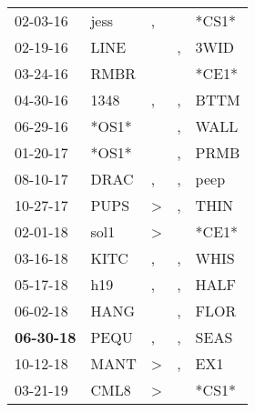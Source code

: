 \begin{supertabular}{p{0.07\textwidth}p{0.06\textwidth}p{0.02\textwidth}p{0.02\textwidth}p{0.06\textwidth}}
          02-03-16\textsuperscript{} &           jess\textsuperscript{} &                , &               &                            *CS1* \\
          02-19-16\textsuperscript{} &           LINE\textsuperscript{} &                  &             , &           3WID\textsuperscript{} \\
          03-24-16\textsuperscript{} &           RMBR\textsuperscript{} &                  &               &                            *CE1* \\
          04-30-16\textsuperscript{} &           1348\textsuperscript{} &                , &             , &           BTTM\textsuperscript{} \\
          06-29-16\textsuperscript{} &                            *OS1* &                  &             , &           WALL\textsuperscript{} \\
          01-20-17\textsuperscript{} &                            *OS1* &                  &             , &           PRMB\textsuperscript{} \\
          08-10-17\textsuperscript{} &           DRAC\textsuperscript{} &                , &             , &           peep\textsuperscript{} \\
          10-27-17\textsuperscript{} &           PUPS\textsuperscript{} &     \textgreater &             , &           THIN\textsuperscript{} \\
          02-01-18\textsuperscript{} &           sol1\textsuperscript{} &     \textgreater &               &                            *CE1* \\
          03-16-18\textsuperscript{} &           KITC\textsuperscript{} &                , &             , &           WHIS\textsuperscript{} \\
          05-17-18\textsuperscript{} &            h19\textsuperscript{} &                , &             , &           HALF\textsuperscript{} \\
          06-02-18\textsuperscript{} &           HANG\textsuperscript{} &                  &             , &           FLOR\textsuperscript{} \\
 \textbf{06-30-18\textsuperscript{}} &           PEQU\textsuperscript{} &                , &             , &           SEAS\textsuperscript{} \\
          10-12-18\textsuperscript{} &           MANT\textsuperscript{} &     \textgreater &             , &            EX1\textsuperscript{} \\
          03-21-19\textsuperscript{} &           CML8\textsuperscript{} &     \textgreater &               &                            *CS1* \\

\end{supertabular}
